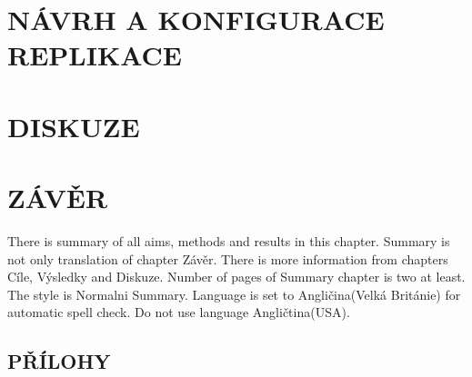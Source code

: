 \documentclass{thesisKGI}
\begin{document}
    \newpage
    \section{NÁVRH A KONFIGURACE REPLIKACE}
      
      
      

    \newpage
    \section{DISKUZE}

    \newpage
    \section{ZÁVĚR}



    \begin{summary}
      There is summary of all aims, methods and results in this chapter.
      Summary is not only translation of chapter Závěr. There is more
      information from chapters Cíle, Výsledky and Diskuze. Number of
      pages of Summary chapter is two at least. The style is Normalni
      Summary. Language is set to Angličina(Velká Británie) for automatic
      spell check. Do not use language Angličtina(USA). 
    \end{summary}

    \newpage
    \vspace*{180pt}
    \begin{center}
    \section*{PŘÍLOHY}
    \end{center}
    \vspace*{\fill}
\end{document}
